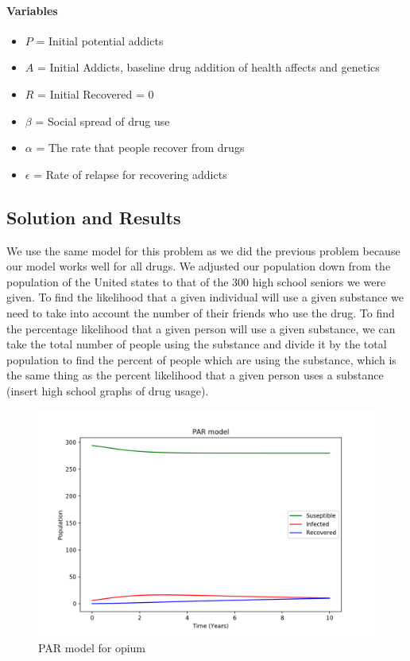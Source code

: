 \documentclass[12pt,letterpaper]{article}
\begin{document}
\paragraph{Variables}
\begin{itemize}[label=]
  \item $P$ = Initial potential addicts
  \item $A$ = Initial Addicts, baseline drug addition of health affects and genetics
  \item $R$ = Initial Recovered = 0
  \item $\beta$ = Social spread of drug use
  \item $\alpha$ = The rate that people recover from drugs
  \item $\epsilon$ = Rate of relapse for recovering addicts
\end{itemize}

\subsection{Solution and Results}
We use the same model for this problem as we did the previous problem because our model works well for all drugs. We adjusted our population down from the population of the United states to that of the 300 high school seniors we were given. To find the likelihood that a given individual will use a given substance we need to take into account the number of their friends who use the drug. To find the percentage likelihood that a given person will use a given substance, we can take the total number of people using the substance and divide it by the total population to find the percent of people which are using the substance, which is the same thing as the percent likelihood that a given person uses a substance (insert high school graphs of drug usage).

\begin{figure}[H]
  \centering
  \includegraphics[width=.8\linewidth]{opium}
  \caption{PAR model for opium}
  \label{fig:opium}
\end{figure}
\end{document}
